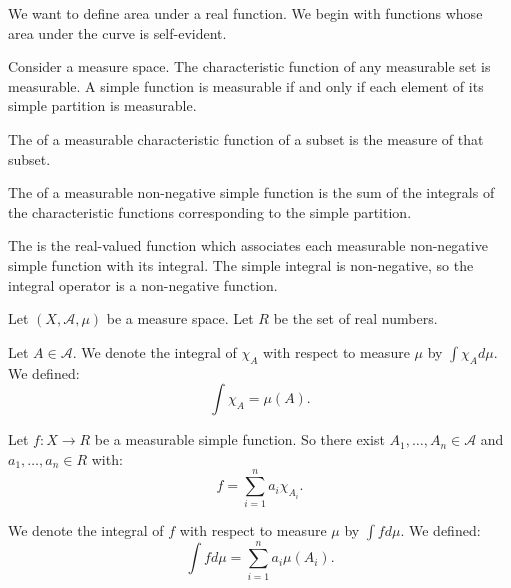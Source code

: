 
\sbasic



\sstart




We want to define area
under a real function.
We begin with functions
whose area under the curve
is self-evident.


Consider a measure space.
The characteristic function
of any measurable set
is measurable.
A simple function is measurable
if and only if
each element of
its simple partition
is measurable.

The
of a measurable characteristic function
of a subset is the
measure of that subset.

The
of a measurable non-negative simple function
is the sum of the integrals
of the characteristic functions
corresponding to the
simple partition.

The
is the real-valued function
which associates
each measurable non-negative simple
function with its integral.
The simple integral is non-negative,
so the integral operator is
a non-negative function.


Let $(X, \mathcal{A}, \mu)$
be a measure space.
Let
$R$ be the
set of real numbers.

Let $A \in \mathcal{A}$.
We denote the integral
of $\chi_{A}$ with
respect to measure $\mu$ by
$\int \chi_{A} d \mu$.
We defined:
\[
  \int \chi_{A} = \mu(A).
\]

Let $f: X \to R$ be
a measurable simple function.
So there exist
$A_1, \dots, A_n \in \mathcal{A}$
and $a_1, \dots, a_n \in R$ with:
\[
  f = \sum_{i = 1}^{n} a_i \chi_{A_i}.
\]

We denote the integral of
$f$
with respect to measure $\mu$
by $\int f d\mu$.
We defined:
\[
  \int f d\mu = \sum_{i = 1}^{n} a_i \mu(A_i).
\]


\strats
